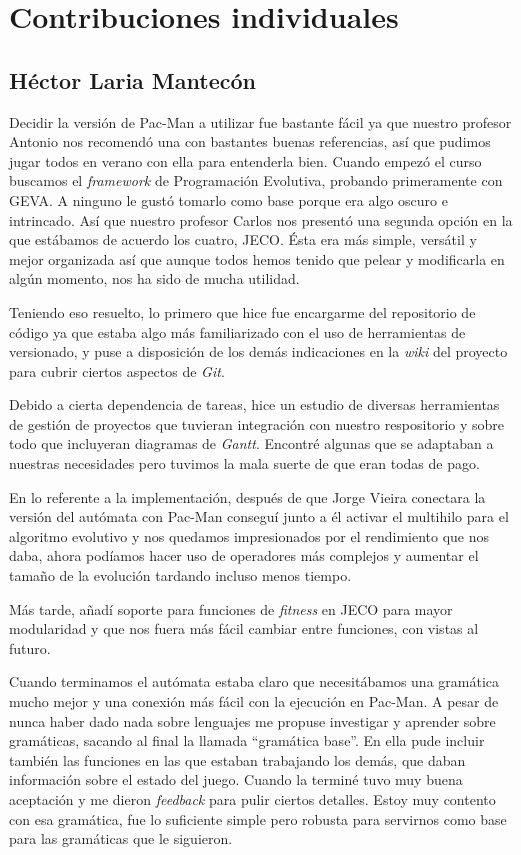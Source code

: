 \chapter{Contribuciones individuales} \label{cap:contribuciones}

\section{Héctor Laria Mantecón}
Decidir la versión de Pac-Man a utilizar fue bastante fácil ya que nuestro profesor Antonio nos recomendó una con bastantes buenas referencias, así que pudimos jugar todos en verano con ella para entenderla bien. Cuando empezó el curso buscamos el \textit{framework} de Programación Evolutiva, probando primeramente con GEVA. A ninguno le gustó tomarlo como base porque era algo oscuro e intrincado. Así que nuestro profesor Carlos nos presentó una segunda opción en la que estábamos de acuerdo los cuatro, JECO. Ésta era más simple, versátil y mejor organizada así que aunque todos hemos tenido que pelear y modificarla en algún momento, nos ha sido de mucha utilidad.

Teniendo eso resuelto, lo primero que hice fue encargarme del repositorio de código ya que estaba algo más familiarizado con el uso de herramientas de versionado, y puse a disposición de los demás indicaciones en la \textit{wiki} del proyecto para cubrir ciertos aspectos de \textit{Git}.

Debido a cierta dependencia de tareas, hice un estudio de diversas herramientas de gestión de proyectos que tuvieran integración con nuestro respositorio y sobre todo que incluyeran diagramas de \textit{Gantt}. Encontré algunas que se adaptaban a nuestras necesidades pero tuvimos la mala suerte de que eran todas de pago.

En lo referente a la implementación, después de que Jorge Vieira conectara la versión del autómata con Pac-Man conseguí junto a él activar el multihilo para el algoritmo evolutivo y nos quedamos impresionados por el rendimiento que nos daba, ahora podíamos hacer uso de operadores más complejos y aumentar el tamaño de la evolución tardando incluso menos tiempo.

Más tarde, añadí soporte para funciones de \textit{fitness} en JECO para mayor modularidad y que nos fuera más fácil cambiar entre funciones, con vistas al futuro.

Cuando terminamos el autómata estaba claro que necesitábamos una gramática mucho mejor y una conexión más fácil con la ejecución en Pac-Man. A pesar de nunca haber dado nada sobre lenguajes me propuse investigar y aprender sobre gramáticas, sacando al final la llamada ``gramática base''. En ella pude incluir también las funciones en las que estaban trabajando los demás, que daban información sobre el estado del juego. Cuando la terminé tuvo muy buena aceptación y me dieron \textit{feedback} para pulir ciertos detalles. Estoy muy contento con esa gramática, fue lo suficiente simple pero robusta para servirnos como base para las gramáticas que le siguieron.


